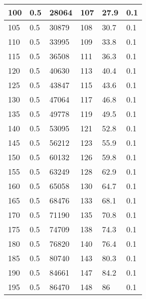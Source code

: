 \begin{center}
\begin{longtable}{|l|l|l|l|l|l|}
100    & 0.5     & 28064            & 107          & 27.9           & 0.1        \\ \hline
105    & 0.5     & 30879            & 108          & 30.7           & 0.1        \\ \hline
110    & 0.5     & 33995            & 109          & 33.8           & 0.1        \\ \hline
115    & 0.5     & 36508            & 111          & 36.3           & 0.1        \\ \hline
120    & 0.5     & 40630            & 113          & 40.4           & 0.1        \\ \hline
125    & 0.5     & 43847            & 115          & 43.6           & 0.1        \\ \hline
130    & 0.5     & 47064            & 117          & 46.8           & 0.1        \\ \hline
135    & 0.5     & 49778            & 119          & 49.5           & 0.1        \\ \hline
140    & 0.5     & 53095            & 121          & 52.8           & 0.1        \\ \hline
145    & 0.5     & 56212            & 123          & 55.9           & 0.1        \\ \hline
150    & 0.5     & 60132            & 126          & 59.8           & 0.1        \\ \hline
155    & 0.5     & 63249            & 128          & 62.9           & 0.1        \\ \hline
160    & 0.5     & 65058            & 130          & 64.7           & 0.1        \\ \hline
165    & 0.5     & 68476            & 133          & 68.1           & 0.1        \\ \hline
170    & 0.5     & 71190            & 135          & 70.8           & 0.1        \\ \hline
175    & 0.5     & 74709            & 138          & 74.3           & 0.1        \\ \hline
180    & 0.5     & 76820            & 140          & 76.4           & 0.1        \\ \hline
185    & 0.5     & 80740            & 143          & 80.3           & 0.1        \\ \hline
190    & 0.5     & 84661            & 147          & 84.2           & 0.1        \\ \hline
195    & 0.5     & 86470            & 148          & 86             & 0.1        \\ \hline

\end{longtable}
\end{center}
